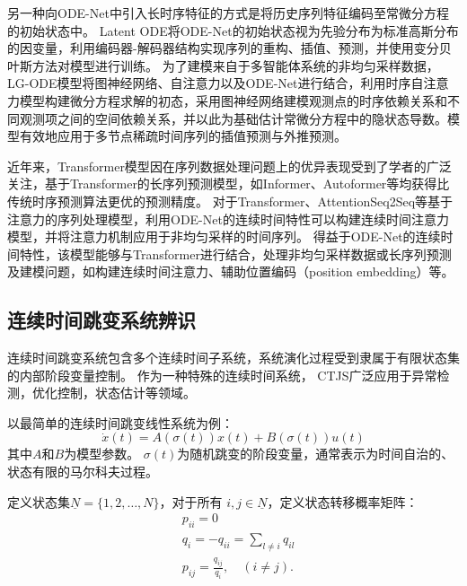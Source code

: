 另一种向ODE-Net中引入长时序特征的方式是将历史序列特征编码至常微分方程的初始状态中。
Latent ODE\cite{10.5555/3454287.3454765}将ODE-Net的初始状态视为先验分布为标准高斯分布的因变量，利用编码器-解码器结构实现序列的重构、插值、预测，并使用变分贝叶斯方法对模型进行训练。
为了建模来自于多智能体系统的非均匀采样数据，LG-ODE模型\cite{Huang2020}将图神经网络、自注意力以及ODE-Net进行结合，利用时序自注意力模型构建微分方程求解的初态，采用图神经网络建模观测点的时序依赖关系和不同观测项之间的空间依赖关系，并以此为基础估计常微分方程中的隐状态导数。模型有效地应用于多节点稀疏时间序列的插值预测与外推预测。

近年来，Transformer模型\cite{Vaswani2017}因在序列数据处理问题上的优异表现受到了学者的广泛关注，基于Transformer的长序列预测模型，如Informer\cite{Zhou2020}、Autoformer\cite{Wu2021}等均获得比传统时序预测算法更优的预测精度。
对于Transformer、AttentionSeq2Seq等基于注意力的序列处理模型，利用ODE-Net的连续时间特性可以构建连续时间注意力模型\cite{chen2021continuous}，并将注意力机制应用于非均匀采样的时间序列。
得益于ODE-Net的连续时间特性，该模型能够与Transformer进行结合，处理非均匀采样数据或长序列预测及建模问题，如构建连续时间注意力\cite{chen2021continuous}、辅助位置编码（position embedding）\cite{Liu2020}等。


\subsection{连续时间跳变系统辨识}
连续时间跳变系统包含多个连续时间子系统，系统演化过程受到隶属于有限状态集的内部阶段变量控制\cite{8709809}。
作为一种特殊的连续时间系统，
CTJS广泛应用于异常检测\cite{9165930}，优化控制\cite{pmlr-v120-jansch-porto20a}，状态估计\cite{8709809}等领域。

以最简单的连续时间跳变线性系统\cite{fang2002stabilization}为例：
\begin{equation}
    \dot{x}(t)=A(\sigma(t)) x(t)+B(\sigma(t)) u(t)
\end{equation}
其中$A$和$B$为模型参数。
$\sigma(t)$为随机跳变的阶段变量，通常表示为时间自治的、状态有限的马尔科夫过程。

定义状态集$\underline{N}=\{1,2, \ldots, N\}$，对于所有 $i, j \in \underline{N}$，定义状态转移概率矩阵：
\begin{equation}
    \begin{aligned}
    &p_{i i}=0\\
    &q_i=-q_{i i}=\sum_{l \neq i} q_{i l}\\
    &p_{i j}=\frac{q_{i j}}{q_i}, \quad(i \neq j) .
    \end{aligned}
\end{equation}

